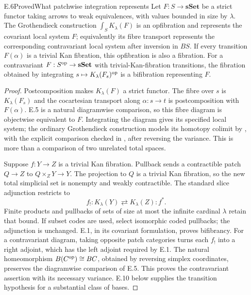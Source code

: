 \begin{statement}{E.6}{Proved}{What patchwise integration represents}
Let $F:S\to\mathbf{sSet}$ be a strict functor taking arrows to weak equivalences, with values bounded in size by $\lambda$. The Grothendieck construction $\int_S K_\lambda(F)$ is an opfibration and represents the covariant local system $F$; equivalently its fibre transport represents the corresponding contravariant local system after inversion in $BS$. If every transition $F(\alpha)$ is a trivial Kan fibration, this opfibration is also a fibration. For a contravariant $F:S^{\mathrm{op}}\to\mathbf{sSet}$ with trivial-Kan-fibration transitions, the fibration obtained by integrating $s\mapsto K_\lambda(F_s)^{\mathrm{op}}$ is a bifibration representing $F$.
\end{statement}
\begin{proof}
Postcomposition makes $K_\lambda(F)$ a strict functor. The fibre over $s$ is $K_\lambda(F_s)$ and the cocartesian transport along $\alpha:s\to t$ is postcomposition with $F(\alpha)$. E.5 is a natural diagramwise comparison, so this fibre diagram is objectwise equivalent to $F$. Integrating the diagram gives its specified local system; the ordinary Grothendieck construction models its homotopy colimit by \citet[Theorem~1.2]{E_Thomason1979}, with the explicit comparison checked in \citet[\S3.1, equation~(9)]{E_Cegarra2020}, after reversing the variance. This is more than a comparison of two unrelated total spaces.

Suppose $f:Y\to Z$ is a trivial Kan fibration. Pullback sends a contractible patch $Q\to Z$ to $Q\times_ZY\to Y$. The projection to $Q$ is a trivial Kan fibration, so the new total simplicial set is nonempty and weakly contractible. The standard slice adjunction restricts to
\[
 f_!:K_\lambda(Y)\rightleftarrows K_\lambda(Z):f^*.
\]
Finite products and pullbacks of sets of size at most the infinite cardinal $\lambda$ retain that bound. If subset codes are used, select isomorphic coded pullbacks; the adjunction is unchanged. E.1, in its covariant formulation, proves bifibrancy. For a contravariant diagram, taking opposite patch categories turns each $f_!$ into a right adjoint, which has the left adjoint required by E.1. The natural homeomorphism $B(C^{\mathrm{op}})\cong BC$, obtained by reversing simplex coordinates, preserves the diagramwise comparison of E.5. This proves the contravariant assertion with its necessary variance. E.10 below supplies the transition hypothesis for a substantial class of bases.
\end{proof}

